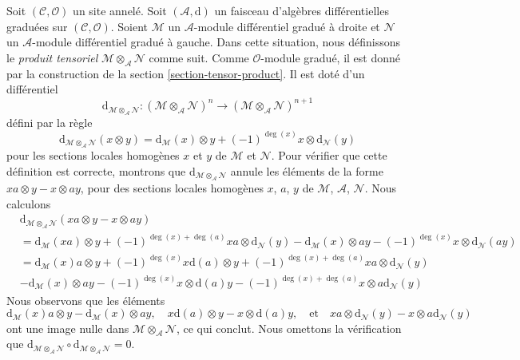 \medskip\noindent
Soit $(\mathcal{C}, \mathcal{O})$ un site annelé. Soit
$(\mathcal{A}, \text{d})$ un
faisceau d'algèbres différentielles graduées sur $(\mathcal{C}, \mathcal{O})$.
Soient $\mathcal{M}$ un $\mathcal{A}$-module différentiel gradué à
droite et $\mathcal{N}$ un $\mathcal{A}$-module différentiel gradué à gauche.
Dans cette situation, nous définissons le {\it produit tensoriel}
$\mathcal{M} \otimes_\mathcal{A} \mathcal{N}$ comme
suit. Comme $\mathcal{O}$-module gradué, il est donné par la
construction de la section \ref{section-tensor-product}. Il est
doté d'un différentiel
$$
\text{d}_{\mathcal{M} \otimes_\mathcal{A} \mathcal{N}}
: (\mathcal{M} \otimes_\mathcal{A} \mathcal{N})^n
\longrightarrow
(\mathcal{M} \otimes_\mathcal{A} \mathcal{N})^{n + 1}
$$
défini par la règle
$$
\text{d}_{\mathcal{M} \otimes_\mathcal{A} \mathcal{N}}(x \otimes y) =
\text{d}_\mathcal{M}(x) \otimes y +
(-1)^{\deg(x)}x \otimes \text{d}_\mathcal{N}(y)
$$ pour
les sections locales homogènes $x$ et $y$ de $\mathcal{M}$ et $\mathcal{N}$. Pour
vérifier que cette définition est correcte, montrons
que $\text{d}_{\mathcal{M} \otimes_\mathcal{A} \mathcal{N}}$ annule les
éléments de la forme $xa \otimes y - x \otimes ay$, pour des sections
locales homogènes $x$, $a$, $y$ de $\mathcal{M}$, $\mathcal{A}$, $\mathcal{N}$.
Nous
calculons \begin{align*}
&
\text{d}_{\mathcal{M} \otimes_\mathcal{A} \mathcal{N}}(
xa \otimes y - x \otimes ay) \\
&
= \text{d}_\mathcal{M}(xa) \otimes y + (-1)^{\deg(x) + \deg(a)}
xa \otimes \text{d}_\mathcal{N}(y)
-\text{d}_\mathcal{M}(x) \otimes ay - (-1)^{\deg(x)}
x \otimes \text{d}_\mathcal{N}(ay) \\
&
= \text{d}_\mathcal{M}(x)a \otimes y + (-1)^{\deg(x)}x\text{d}(a) \otimes
y + (-1)^{\deg(x) + \deg(a)} xa \otimes \text{d}_\mathcal{N}(y) \\
&
-\text{d}_\mathcal{M}(x) \otimes ay - (-1)^{\deg(x)}
x \otimes \text{d}(a)y - (-1)^{\deg(x) +
\deg(a)} x\otimes a\text{d}_\mathcal{N}(y)
\end{align*}
Nous observons que les éléments
$$
\text{d}_\mathcal{M}(x)a \otimes y - \text{d}_\mathcal{M}(x) \otimes ay,\quad
x\text{d}(a) \otimes y - x \otimes \text{d}(a)y,\quad
\text{et}\quad xa
\otimes \text{d}_\mathcal{N}(y) - x\otimes a\text{d}_\mathcal{N}(y)
$$ ont une
image nulle dans $\mathcal{M} \otimes_\mathcal{A} \mathcal{N}$,
ce qui conclut. Nous omettons la vérification
que $\text{d}_{\mathcal{M} \otimes_\mathcal{A} \mathcal{N}} \circ
\text{d}_{\mathcal{M} \otimes_\mathcal{A} \mathcal{N}} = 0$.

